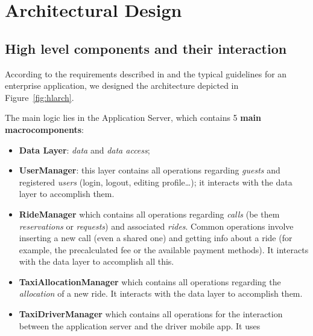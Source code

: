 \pagebreak
\section{Architectural Design}
 



\subsection{High level components and their interaction}
According to the requirements described in \cite{rasd} and the typical guidelines for an enterprise application, we designed the architecture depicted in Figure~\ref{fig:hlarch}. 

The main logic lies in the Application Server, which contains 5 \textbf{main macrocomponents}:
\begin{itemize}
    \item \textbf{Data Layer}: \emph{data} and \emph{data access};
    \item \textbf{UserManager}: this layer contains all operations regarding \emph{guests} and registered \emph{users} (login, logout, editing profile\ldots); it interacts with the data layer to accomplish them.
    \item \textbf{RideManager} which contains all operations regarding \emph{calls} (be them \emph{reservations} or \emph{requests}) and associated \emph{rides}. Common operations involve inserting a new call (even a shared one) and getting info about a ride (for example, the precalculated fee or the available payment methods). It interacts with the data layer to accomplish all this.
    \item \textbf{TaxiAllocationManager} which contains all operations regarding the \emph{allocation} of a new ride. It interacts with the data layer to accomplish them.
    \item \textbf{TaxiDriverManager} which contains all operations for the interaction between the application server and the driver mobile app. It uses 
\end{itemize}

